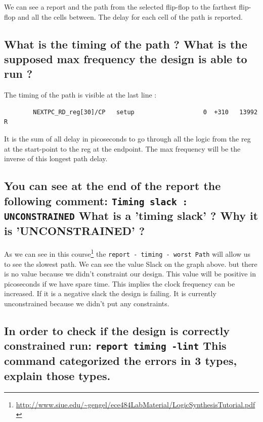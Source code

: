 \documentclass[11pt,a4paper,sans,dvipsnames]{report}
\begin{document}
	We can see a report and the path from the selected flip-flop to the farthest flip-flop and all the cells between. The delay for each cell of the path is reported.

	\subsection*{What is the timing of the path ? What is the supposed max frequency the design is able to run ? }

	The timing of the path is visible at the last line :
	\begin{lstlisting}
		NEXTPC_RD_reg[30]/CP   setup                   0  +310   13992 R 
	\end{lstlisting}
	It is the sum of all delay in picoseconds to go through all the logic from the reg at the start-point to the reg at the endpoint. The max frequency will be the inverse of this longest path delay.

	\subsection*{You can see at the end of the report the following comment: \texttt{Timing slack : UNCONSTRAINED} What is a 'timing slack' ? Why it is 'UNCONSTRAINED' ?}

	As we can see in this course\footnote{\url{http://www.siue.edu/~gengel/ece484LabMaterial/LogicSynthesisTutorial.pdf}} the \texttt{report - timing - worst Path} will allow us to see the slowest path. We can see the value Slack on the graph above. but there is no value because we didn't constraint our design. This value will be positive in picoseconds if we have spare time. This implies the clock frequency can be increased. If it is a negative slack the design is failing. It is currently unconstrained because we didn't put any constraints.

	\subsection*{In order to check if the design is correctly constrained run: \texttt{report timing -lint} This command categorized the errors in 3 types, explain those types.}
\end{document}
